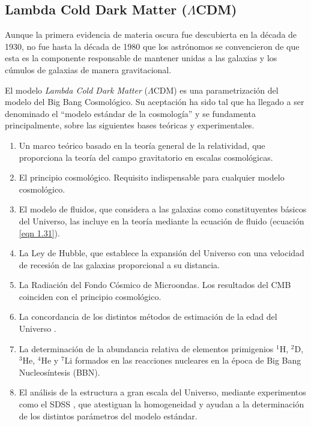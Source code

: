 \documentclass[a4paper,openright,12pt]{book}
\begin{document}



\subsection{Lambda Cold Dark Matter ($\Lambda$CDM)}
Aunque la primera evidencia de materia oscura fue descubierta en la década de 1930, no fue hasta la década de 1980 que los astrónomos se convencieron de que esta es la componente responsable de mantener unidas a las galaxias y los cúmulos de galaxias de manera gravitacional.

El modelo \textit{Lambda Cold Dark Matter} ($\Lambda$CDM) es una parametrización del modelo del Big Bang Cosmológico. Su aceptación ha sido tal que ha llegado a ser denominado  el ``modelo estándar de la cosmología'' y se  fundamenta principalmente, sobre las siguientes bases teóricas y experimentales. 
\begin{enumerate}
\item Un marco teórico basado en la teoría general de la relatividad, que proporciona la teoría del campo gravitatorio en escalas cosmológicas.
\item El principio cosmológico. Requisito indispensable para cualquier modelo cosmológico.
\item El modelo de fluidos, que considera a las galaxias como constituyentes básicos del Universo, las incluye en la teoría mediante la ecuación de fluido (ecuación \ref{eqn 1.31}).
\item La Ley de Hubble, que establece la expansión del Universo con una velocidad de recesión de las galaxias proporcional a su distancia.
\item La Radiación del Fondo Cósmico de Microondas. Los resultados del CMB coinciden con el principio cosmológico.
\item La concordancia de los distintos métodos de estimación de la edad del Universo \cite{1.1.5}. 
\item La determinación de la abundancia relativa de elementos primigenios $^{1}$H, $^{2}$D, $^{3}$He, $^{4}$He y $^{7}$Li formados en las reacciones nucleares en la época de Big Bang Nucleosíntesis (BBN)\cite{1.1.6, 1.1.7, 1.1.8}.
\item El análisis de la estructura a gran escala del Universo, mediante experimentos como el SDSS \cite{1.1.9} , que atestiguan la homogeneidad y ayudan a la determinación de los distintos parámetros del modelo estándar.

\end{enumerate}
\end{document}
